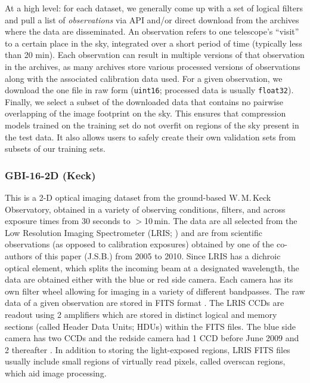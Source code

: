 At a high level: for each dataset, we generally come up with a set of logical filters and pull a list of \textit{observations} via API and/or direct download from the archives where the data are disseminated. An observation refers to one telescope's ``visit'' to a certain place in the sky, integrated over a short period of time (typically less than 20 min). Each observation can result in multiple versions of that observation in the archives, as many archives store various processed versions of observations along with the associated calibration data used. For a given observation, we download the one file in raw form (\texttt{uint16}; processed data is usually \texttt{float32}). Finally, we select a subset of the downloaded data that contains no pairwise overlapping of the image footprint on the sky. This ensures that compression models trained on the training set do not overfit on regions of the sky present in the test data. It also allows users to safely create their own validation sets from subsets of our training sets.

\subsubsection{GBI-16-2D (Keck)}

This is a 2-D optical imaging dataset from the ground-based W.\,M.\,Keck Observatory, obtained in a variety of observing conditions, filters, and across exposure times from 30 seconds to $>$10\,min.  The data are all selected from the Low Resolution Imaging Spectrometer (LRIS; \citet{1995PASP..107..375O}) and are from scientific observations (as opposed to calibration exposures) obtained by one of the co-authors of this paper (J.S.B.) from 2005 to 2010. Since LRIS has a dichroic optical element, which splits the incoming beam at a designated wavelength, the data are obtained either with the blue or red side camera. Each camera has its own filter wheel allowing for imaging in a variety of different bandpasses. The raw data of a given observation are stored in FITS format \citep{2010A&A...524A..42P}. The LRIS CCDs are readout using 2 amplifiers which are stored in distinct logical and memory sections (called Header Data Units; HDUs) within the FITS files. The blue side camera has two CCDs and the redside camera had 1 CCD before June 2009 and 2 thereafter \citep{2010SPIE.7735E..0RR}. In addition to storing the light-exposed regions, LRIS FITS files usually include small regions of virtually read pixels, called overscan regions, which aid image processing.

